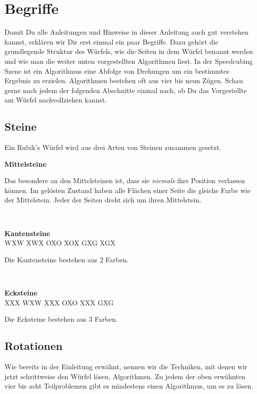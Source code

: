 \section{Begriffe}

Damit Du alle Anleitungen und Hinweise in dieser Anleitung auch gut verstehen kannst, erklären wir Dir erst einmal ein paar Begriffe.
Dazu gehört die grundlegende Struktur des Würfels, wie die Seiten in dem Würfel benannt werden und wie man die weiter unten vorgestellten Algorithmen liest.
In der Speedcubing Szene ist ein Algorithmus eine Abfolge von Drehungen um ein bestimmtes Ergebnis zu erzielen.
Algorithmen bestehen oft aus vier bis neun Zügen.
Schau gerne nach jedem der folgenden Abschnitte einmal nach, ob Du das Vorgestellte am Würfel nachvollziehen kannst.

\subsection{Steine}

Ein Rubik's Würfel wird aus drei Arten von Steinen zusammen gesetzt. \\[1em]

\parbox{0.3\linewidth}{
  \centering
  \textbf{Mittelsteine}\\[1em] \RubikCubeGreyWY{}
}
\parbox{0.7\linewidth}{
Das besondere an den Mittelsteinen ist, dass sie \emph{niemals} ihre Position verlassen können.
Im gelösten Zustand haben alle Flächen einer Seite die gleiche Farbe wie der Mittelstein.
Jeder der Seiten dreht sich um ihren Mittelstein.
}\\[1em]
\parbox{0.3\linewidth}{
  \centering
  \textbf{Kantensteine}\\[1em]
  \RubikCubeGreyAll%
	{W}{X}{W}
	{X}{W}{X}%
	   {O}{X}{O}
	   {X}{O}{X}%
	   {G}{X}{G}
	   {X}{G}{X}%
}
\parbox{0.7\linewidth}{
  Die Kantensteine bestehen aus 2 Farben.
}\\[1em]
\parbox{0.3\linewidth}{
  \centering
  \textbf{Ecksteine}\\[1em]
  \RubikCubeGreyAll%
	{X}{X}{X}
	{W}{X}{W}%
	   {X}{X}{X}
	   {O}{X}{O}%
	   {X}{X}{X}
	   {G}{X}{G}%
}
\parbox{0.7\linewidth}{
  Die Ecksteine bestehen aus 3 Farben.
}

\subsection{Rotationen}
Wie bereits in der Einleitung erwähnt, nennen wir die Techniken, mit denen wir jetzt schrittweise den Würfel lösen, Algorithmen.
Zu jedem der oben erwähnten vier bis acht Teilproblemen gibt es mindestens einen Algorithmus, um es zu lösen.

